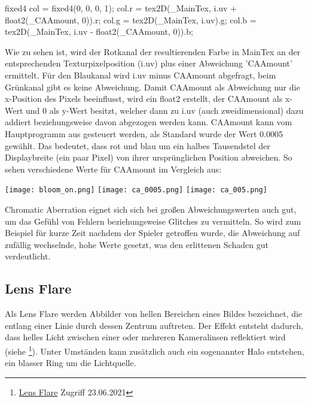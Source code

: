 \begin{hlsl}
    fixed4 col = fixed4(0, 0, 0, 1);
    col.r = tex2D(_MainTex, i.uv + float2(_CAAmount, 0)).r;
    col.g = tex2D(_MainTex, i.uv).g;
    col.b = tex2D(_MainTex, i.uv - float2(_CAAmount, 0)).b;
\end{hlsl}

Wie zu sehen ist, wird der Rotkanal der resultierenden Farbe in MainTex an der entsprechenden Texturpixelposition (i.uv) plus einer Abweichung 'CAAmount' ermittelt. Für den Blaukanal wird i.uv minus CAAmount abgefragt, beim Grünkanal gibt es keine Abweichung. Damit CAAmount als Abweichung nur die x-Position des Pixels beeinflusst, wird ein float2 erstellt, der CAAmount als x-Wert und 0 als y-Wert besitzt, welcher dann zu i.uv (auch zweidimensional) dazu addiert beziehungsweise davon abgezogen werden kann.
CAAmount kann vom Hauptprogramm aus gesteuert werden, als Standard wurde der Wert 0.0005 gewählt. Das bedeutet, dass rot und blau um ein halbes Tausendstel der Displaybreite (ein paar Pixel) von ihrer ursprünglichen Position abweichen. So sehen verschiedene Werte für CAAmount im Vergleich aus:

\captionsetup{type=figure}
\texttt{[image: bloom\_on.png]}
\texttt{[image: ca\_0005.png]}
\texttt{[image: ca\_005.png]}

Chromatic Aberration eignet sich sich bei gro{\ss}en Abweichungswerten auch gut, um das Gefühl von Fehlern beziehungsweise Glitches zu vermitteln. So wird zum Beispiel für kurze Zeit nachdem der Spieler getroffen wurde, die Abweichung auf zufällig wechselnde, hohe Werte gesetzt, was den erlittenen Schaden gut verdeutlicht.



\subsection{Lens Flare}

Als Lens Flare werden Abbilder von hellen Bereichen eines Bildes bezeichnet, die entlang einer Linie durch dessen Zentrum auftreten. Der Effekt entsteht dadurch, dass helles Licht zwischen einer oder mehreren Kameralinsen reflektiert wird (siehe \footnote{\href{https://de.wikipedia.org/wiki/Lens_Flare}{Lens Flare} Zugriff 23.06.2021}). Unter Umständen kann zusätzlich auch ein sogenannter Halo entstehen, ein blasser Ring um die Lichtquelle.

